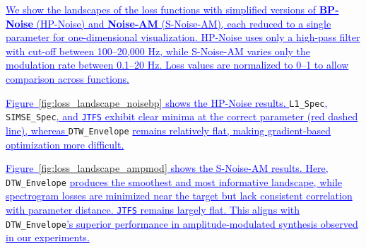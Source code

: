 \documentclass[lettersize,journal]{IEEEtran}
\renewcommand{\DIFadd}[1]{\textcolor{blue}{\uline{#1}}}
\newcommand{\SIMSESpec}{\texttt{SIMSE\_Spec}}
\newcommand{\LoneSpec}{\texttt{L1\_Spec}}
\newcommand{\JTFS}{\texttt{JTFS}}
\newcommand{\DTWEnv}{\texttt{DTW\_Envelope}}
\newcommand{\BPNoise}{\textbf{BP-Noise}}
\newcommand{\AmpMod}{\textbf{Noise-AM}}
\providecommand{\DIFadd}[1]{{\protect\color{blue}\uwave{#1}}} %
\begin{document}
\DIFadd{We show the landscapes of the loss functions with simplified versions of \BPNoise{} (HP-Noise) and \AmpMod{} (S-Noise-AM), each reduced to a single parameter for one-dimensional visualization. HP-Noise uses only a high-pass filter with cut-off between 100–20,000 Hz, while S-Noise-AM varies only the modulation rate between 0.1–20 Hz. Loss values are normalized to 0–1 to allow comparison across functions.
}

\DIFadd{Figure~\ref{fig:loss_landscape_noisebp} shows the HP-Noise results. }\LoneSpec{}\DIFadd{, }\SIMSESpec{}\DIFadd{, and \JTFS{} exhibit clear minima at the correct parameter (red dashed line), whereas }\DTWEnv{} \DIFadd{remains relatively flat, making gradient-based optimization more difficult.
}

\DIFadd{Figure~\ref{fig:loss_landscape_ampmod} shows the S-Noise-AM results. Here, }\DTWEnv{} \DIFadd{produces the smoothest and most informative landscape, while spectrogram losses are minimized near the target but lack consistent correlation with parameter distance. \JTFS{} remains largely flat. This aligns with }\DTWEnv\DIFadd{'s superior performance in amplitude-modulated synthesis observed in our experiments.
}
\end{document}
